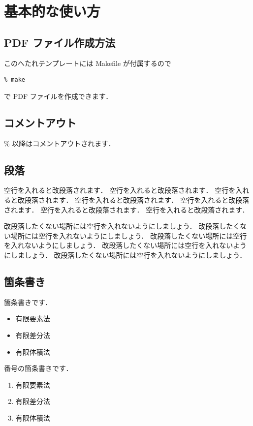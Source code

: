 \chapter{基本的な使い方}
\section{PDF ファイル作成方法}
このへたれテンプレートには Makefile が付属するので
\begin{verbatim}
% make
\end{verbatim}
で PDF ファイルを作成できます．
\section{コメントアウト}
\% 以降はコメントアウトされます．
\section{段落}
空行を入れると改段落されます．
空行を入れると改段落されます．
空行を入れると改段落されます．
空行を入れると改段落されます．
空行を入れると改段落されます．
空行を入れると改段落されます．
空行を入れると改段落されます．

改段落したくない場所には空行を入れないようにしましょう．
改段落したくない場所には空行を入れないようにしましょう．
改段落したくない場所には空行を入れないようにしましょう．
%
改段落したくない場所には空行を入れないようにしましょう．
改段落したくない場所には空行を入れないようにしましょう．
\section{箇条書き}
箇条書きです．
\begin{itemize}
 \item 有限要素法
 \item 有限差分法
 \item 有限体積法
\end{itemize}

番号の箇条書きです．
\begin{enumerate}
 \item 有限要素法
 \item 有限差分法
 \item 有限体積法
\end{enumerate}

